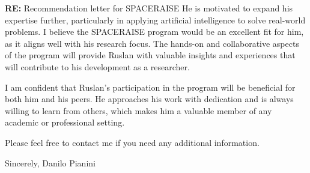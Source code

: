 \documentclass[12pt,a4paper]{letter} %
\newcommand{\Who}{Danilo Pianini} %
\begin{document}
\begin{letter}{\textbf{RE:} Recommendation letter for SPACERAISE}
He is motivated to expand his expertise further, particularly in applying artificial intelligence to solve real-world problems.
%
I believe the SPACERAISE program would be an excellent fit for him,
as it aligns well with his research focus.
%
The hands-on and collaborative aspects of the program will provide Ruslan with valuable insights and experiences that will contribute to his development as a researcher.

I am confident that Ruslan's participation in the program will be beneficial for both him and his peers.
%
He approaches his work with dedication and is always willing to learn from others,
which makes him a valuable member of any academic or professional setting.

Please feel free to contact me if you need any additional information.

\vspace{0.1\textwidth}

\hfill{}Sincerely, \Who





\end{letter}
\end{document}
